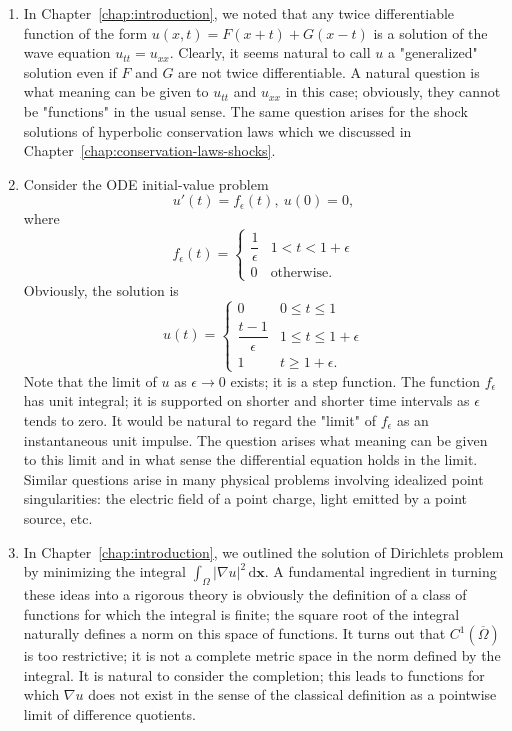 \begin{enumerate}
\item In Chapter~\ref{chap:introduction}, we noted that any twice differentiable function of the form $u(x,t)=F(x+t)+G(x-t)$ is a solution of the wave equation $u_{tt}=u_{xx}$. Clearly, it seems natural to call $u$ a "generalized" solution even if $F$ and $G$ are not twice differentiable. A natural question is what meaning can be given to $u_{tt}$ and $u_{xx}$ in this case; obviously, they cannot be "functions" in the usual sense. The same question arises for the shock solutions of hyperbolic conservation laws which we discussed in Chapter~\ref{chap:conservation-laws-shocks}.
\item Consider the ODE initial-value problem
\begin{equation}\label{eq:impulse-ode-initial-value-problem}
u'(t)=f_\epsilon(t),\ u(0)=0,
\end{equation}
where
\begin{equation}\label{eq:unit-impulse-approximating-pulse}
f_\epsilon(t)=\begin{cases}\dfrac1\epsilon&1<t<1+\epsilon\\0&\text{otherwise.}\end{cases}
\end{equation}
Obviously, the solution is
\begin{equation}\label{eq:impulse-ode-piecewise-solution}
u(t)=\begin{cases}0&0\leq t\leq1\\\dfrac{t-1}{\epsilon}&1\leq t\leq1+\epsilon\\1&t\geq1+\epsilon.\end{cases}
\end{equation}
Note that the limit of $u$ as $\epsilon\to0$ exists; it is a step function. The function $f_\epsilon$ has unit integral; it is supported on shorter and shorter time intervals as $\epsilon$ tends to zero. It would be natural to regard the "limit" of $f_\epsilon$ as an instantaneous unit impulse. The question arises what meaning can be given to this limit and in what sense the differential equation holds in the limit. Similar questions arise in many physical problems involving idealized point singularities: the electric field of a point charge, light emitted by a point source, etc.
\item In Chapter~\ref{chap:introduction}, we outlined the solution of Dirichlet\textquotesingle s problem by minimizing the integral $\int_\Omega|\nabla u|^2\,\mathrm{d}\bm{x}$. A fundamental ingredient in turning these ideas into a rigorous theory is obviously the definition of a class of functions for which the integral is finite; the square root of the integral naturally defines a norm on this space of functions. It turns out that $C^1(\overline\Omega)$ is too restrictive; it is not a complete metric space in the norm defined by the integral. It is natural to consider the completion; this leads to functions for which $\nabla u$ does not exist in the sense of the classical definition as a pointwise limit of difference quotients.

\end{enumerate}
